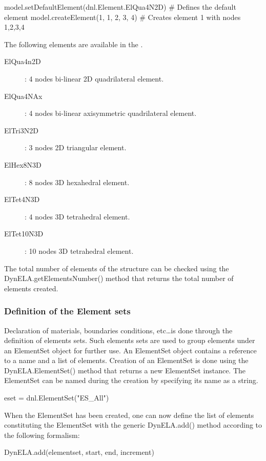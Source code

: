 \begin{PythonListing}
model.setDefaultElement(dnl.Element.ElQua4N2D) # Defines the default element
model.createElement(1, 1, 2, 3, 4)             # Creates element 1 with nodes 1,2,3,4
\end{PythonListing}

The following elements are available in the \DynELA.
\begin{description}
\item [ElQua4n2D]: 4 nodes bi-linear 2D quadrilateral element.
\item [ElQua4NAx]: 4 nodes bi-linear axisymmetric quadrilateral element.
\item [ElTri3N2D]: 3 nodes 2D triangular element.
\item [ElHex8N3D]: 8 nodes 3D hexahedral element.
\item [ElTet4N3D]: 4 nodes 3D tetrahedral element.
\item [ElTet10N3D]: 10 nodes 3D tetrahedral element.
\end{description}
The total number of elements of the structure can be checked using the \textsf{DynELA.getElementsNumber()} method that returns the total number of elements created.

\subsubsection{Definition of the Element sets}

Declaration of materials, boundaries conditions, etc\ldots is done through the definition of elements sets. Such elements sets are used to group elements under an \textsf{ElementSet} object for further use. An \textsf{ElementSet} object contains a reference to a name and a list of elements. Creation of an \textsf{ElementSet} is done using the \textsf{DynELA.ElementSet()} method that returns a new \textsf{ElementSet} instance. The \textsf{ElementSet} can be named during the creation by specifying its name as a string.

\begin{PythonListing}
eset = dnl.ElementSet("ES_All")
\end{PythonListing}

When the \textsf{ElementSet} has been created, one can now define the list of elements constituting the \textsf{ElementSet} with the generic \textsf{DynELA.add()} method according to the following formalism:

\textsf{DynELA.add(elementset, start, end, increment)}

